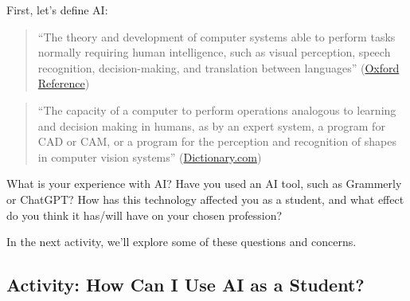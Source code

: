 \documentclass[
]{book}
\theoremstyle{definition}
\theoremstyle{definition}
\theoremstyle{definition}
\theoremstyle{definition}
\theoremstyle{remark}
\begin{document}
First, let's define AI:

\begin{quote}
``The theory and development of computer systems able to perform tasks normally requiring human intelligence, such as visual perception, speech recognition, decision-making, and translation between languages'' (\href{https://www.oxfordreference.com/display/10.1093/oi/authority.20110803095426960}{Oxford Reference})
\end{quote}

\begin{quote}
``The capacity of a computer to perform operations analogous to learning and decision making in humans, as by an expert system, a program for CAD or CAM, or a program for the perception and recognition of shapes in computer vision systems'' (\href{https://www.dictionary.com/browse/artificial-intelligence}{Dictionary.com})
\end{quote}

What is your experience with AI? Have you used an AI tool, such as Grammerly or ChatGPT? How has this technology affected you as a student, and what effect do you think it has/will have on your chosen profession?

In the next activity, we'll explore some of these questions and concerns.

\hypertarget{activity-how-can-i-use-ai-as-a-student}{%
\subsection*{Activity: How Can I Use AI as a Student?}\label{activity-how-can-i-use-ai-as-a-student}}
\end{document}
